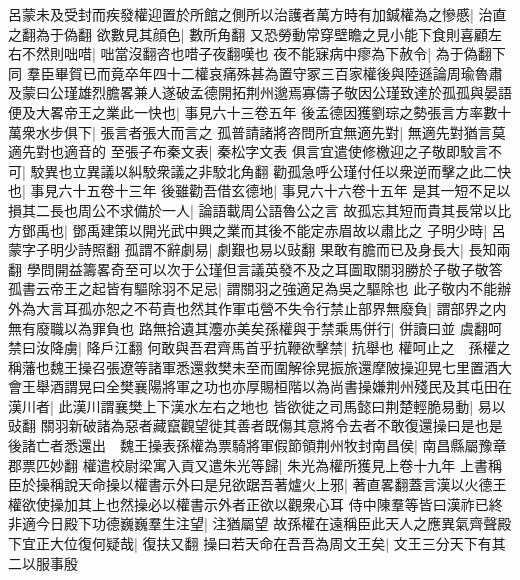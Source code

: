 呂蒙未及受封而疾發權迎置於所館之側所以治護者萬方時有加鍼權為之慘慼|{
	治直之翻為于偽翻}
欲數見其顔色|{
	數所角翻}
又恐勞動常穿壁瞻之見小能下食則喜顧左右不然則咄唶|{
	咄當沒翻咨也唶子夜翻嘆也}
夜不能寐病中瘳為下赦令|{
	為于偽翻下同}
羣臣畢賀已而竟卒年四十二權哀痛殊甚為置守冢三百家權後與陸遜論周瑜魯肅及蒙曰公瑾雄烈膽畧兼人遂破孟德開拓荆州邈焉寡儔子敬因公瑾致達於孤孤與晏語便及大畧帝王之業此一快也|{
	事見六十三卷五年}
後孟德因獲劉琮之勢張言方率數十萬衆水步俱下|{
	張言者張大而言之}
孤普請諸將咨問所宜無適先對|{
	無適先對猶言莫適先對也適音的}
至張子布秦文表|{
	秦松字文表}
俱言宜遣使修檄迎之子敬即駮言不可|{
	駮異也立異議以糾駮衆議之非駮北角翻}
勸孤急呼公瑾付任以衆逆而擊之此二快也|{
	事見六十五卷十三年}
後雖勸吾借玄德地|{
	事見六十六卷十五年}
是其一短不足以損其二長也周公不求備於一人|{
	論語載周公語魯公之言}
故孤忘其短而貴其長常以比方鄧禹也|{
	鄧禹建策以開光武中興之業而其後不能定赤眉故以肅比之}
子明少時|{
	呂蒙字子明少詩照翻}
孤謂不辭劇易|{
	劇艱也易以䜴翻}
果敢有膽而已及身長大|{
	長知兩翻}
學問開益籌畧奇至可以次于公瑾但言議英發不及之耳圖取關羽勝於子敬子敬答孤書云帝王之起皆有驅除羽不足忌|{
	謂關羽之強適足為吳之驅除也}
此子敬内不能辦外為大言耳孤亦恕之不苟責也然其作軍屯營不失令行禁止部界無廢負|{
	謂部界之内無有廢職以為罪負也}
路無拾遺其灋亦美矣孫權與于禁乘馬併行|{
	併讀曰並}
虞翻呵禁曰汝降虜|{
	降戶江翻}
何敢與吾君齊馬首乎抗鞭欲擊禁|{
	抗舉也}
權呵止之　孫權之稱藩也魏王操召張遼等諸軍悉還救樊未至而圍解徐晃振旅還摩陂操迎晃七里置酒大會王舉酒謂晃曰全樊襄陽將軍之功也亦厚賜桓階以為尚書操嫌荆州殘民及其屯田在漢川者|{
	此漢川謂襄樊上下漢水左右之地也}
皆欲徙之司馬懿曰荆楚輕脆易動|{
	易以䜴翻}
關羽新破諸為惡者藏竄觀望徙其善者既傷其意將令去者不敢復還操曰是也是後諸亡者悉還出　魏王操表孫權為票騎將軍假節領荆州牧封南昌侯|{
	南昌縣屬豫章郡票匹妙翻}
權遣校尉梁寓入貢又遣朱光等歸|{
	朱光為權所獲見上卷十九年}
上書稱臣於操稱說天命操以權書示外曰是兒欲踞吾著爐火上邪|{
	著直畧翻蓋言漢以火德王權欲使操加其上也然操必以權書示外者正欲以觀衆心耳}
侍中陳羣等皆曰漢祚已終非適今日殿下功德巍巍羣生注望|{
	注猶屬望}
故孫權在遠稱臣此天人之應異氣齊聲殿下宜正大位復何疑哉|{
	復扶又翻}
操曰若天命在吾吾為周文王矣|{
	文王三分天下有其二以服事殷}


